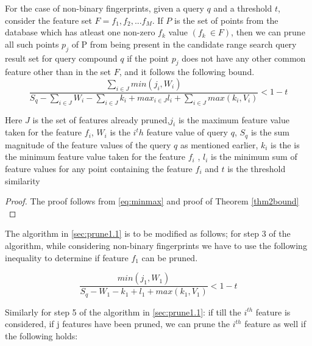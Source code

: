 \begin{thm}
\label{thm4bound}
For the case of non-binary fingerprints, given a query $q$ and a threshold $t$, consider the feature set $F=f_1, f_2,...f_M$. If $P$ is the set of points from the database which has atleast one non-zero $f_k$ value $(f_k~\in F)$, then we can prune all such points $p_j$ of P from being present in the candidate range search query result set for query compound $q$ if the point $p_j$ does not have any other common feature other than in the set $F$, and it follows the following bound. 
\begin{equation}
\label{eq:boun4}
\frac{\sum\limits_{i \in J}min(j_i,W_i)}{S_q - \sum\limits_{i \in J}W_i -\sum\limits_{i \in J}k_i + max_{i \in J}l_i + \sum\limits_{i \in J}max (k_i, V_i)}  < 1-t
\end{equation}	

Here $J$ is the set of features already pruned,$j_i$ is the maximum feature value taken for the feature $f_i$, $W_i$ is the $i^th$ feature value of query $q$, $S_q$ is the sum magnitude of the feature values of the query $q$ as mentioned earlier, $k_i$ is the is the minimum feature value taken for the feature $f_i$ , $l_i$ is the minimum sum of feature values for any point containing the feature $f_i$ and $t$ is the threshold similarity

\end{thm}

\begin{proof}
\label{proof4}
The proof follows from \autoref{eq:minmax} and proof of Theorem \autoref{thm2bound} \\ 
\end{proof}













The algorithm in \autoref{sec:prune1.1} is to be modified as follows; for step 3 of the algorithm, while considering non-binary fingerprints we have to use the following inequality to determine if feature $f_1$ can be pruned.

\begin{equation}
\label{nonbineq1}
\frac{min(j_1,W_1)}{S_q - W_1 -k_1 + l_1 + max (k_1, V_1)}  < 1-t
\end{equation}

Similarly for step 5 of the algorithm in \autoref{sec:prune1.1}: if till the $i^{th}$ feature is considered, if j features have been pruned, we can prune the $i^{th}$ feature as well if the following holds:
		
